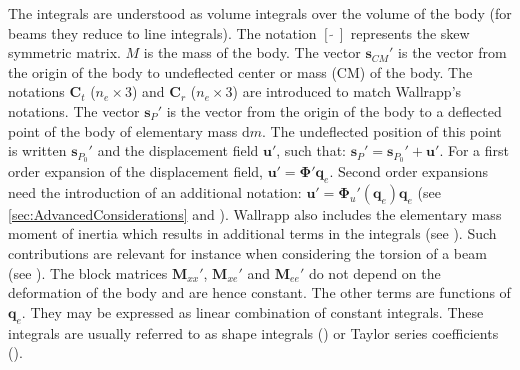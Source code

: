 \documentclass[wes, manuscript]{copernicus}
\renewcommand{\d}{\mathrm{d}}
\renewcommand{\v}[1]{\boldsymbol{#1}}
\newcommand{\m}[1]{\boldsymbol{#1}}
\newcommand{\M} {{\m{M}}}
\newcommand{\s}{\v{s}}
\renewcommand{\d}{\mathrm{d}}
\newcommand{\dm}{\d{m}}
\begin{document}
The integrals are understood as volume integrals over the volume of the body (for beams they reduce to line integrals). The notation $[\tilde{\ \ }]$ represents the skew symmetric matrix. $M$ is the mass of the body. 
The vector $\v{s}_{CM}'$ is the vector from the origin of the body to undeflected center or mass (CM) of the body. The notations $\m{C}_t$ ($n_e\times 3$) and $\m{C}_r$ ($n_e\times 3$) are introduced to match Wallrapp's notations. The vector $\s_{P}'$ is the vector from the origin of the body to a deflected point of the body of elementary mass $\dm$. The undeflected position of this point is written $\s_{P_0}'$ and the displacement field $\v{u}'$, such that:  $\s_{P}'=\s_{P_0}' + \v{u}'$.
For a first order expansion of the displacement field, $\v{u}'=\m{\Phi}' \v{q}_e$. Second order expansions need the introduction of an additional notation:  $\v{u}'=\m{\Phi}_u'(\v{q}_e) \v{q}_e$ (see \autoref{sec:AdvancedConsiderations} and \cite{Wallrapp:1994}).
Wallrapp also includes the elementary mass moment of inertia which results in additional terms in the integrals (see \cite{Wallrapp:1994}). Such contributions are relevant for instance when considering the torsion of a beam (see \cite{branlard:2019flex}).
The block matrices $\M_{xx}'$, $\M_{xe}'$ and $\M_{e e }'$ do not depend on the deformation of the body and are hence constant. The other terms are functions of $\v{q}_e$. They may be expressed as linear combination of constant integrals. These integrals are usually referred to as shape integrals (\cite{shabana:book}) or Taylor series coefficients (\cite{Wallrapp:1994}). 
\end{document}
